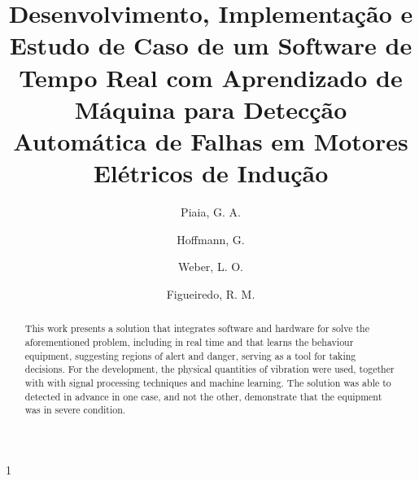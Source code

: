 \documentclass[a4paper]{ifacconf}
\def\portugues{1}
\def\portugues{0}
\begin{document}
	
	
\if\portugues1

% 
	
\begin{frontmatter}

\title{Desenvolvimento, Implementação e Estudo de Caso de um Software de Tempo Real com Aprendizado de Máquina
para Detecção Automática de Falhas em Motores Elétricos de Indução} 



\author[First]{Piaia, G. A.} 
\author[Second]{Hoffmann, G.} 
\author[Third]{Weber, L. O.}
\author[Fourth]{Figueiredo, R. M.}

\address[First]{Programa de Pós-Graduação em Engenharia Elétrica, Universidade do Vale do Rio Dos Sinos - 
UNISINOS, RS \& Floki Desenvolvimento de Sistemas Industriais, RS (e-mail: piaia@flokisys.com).}
\address[Second]{Floki Desenvolvimento de Sistemas Industriais, RS (e-mail: giu@flokisys.com).}
\address[Third]{Floki Desenvolvimento de Sistemas Industriais, RS (e-mail: weber@flokisys.com).}
\address[Fourth]{Programa de Pós-Graduação em Engenharia Elétrica, Universidade do Vale do Rio Dos Sinos - 
UNISINOS, RS (e-mail: marquesf@unisinos.br).}



\renewcommand{\abstractname}{{\bf Abstract:~}}
\begin{abstract}                %
                        This work presents a solution that integrates software and hardware for solve the aforementioned problem,
                        including in real time and that learns the behaviour equipment, suggesting regions of alert and
                        danger, serving as a tool for taking decisions. For the development, the physical quantities of
                        vibration were used, together with with signal processing techniques and machine learning. 
                        The solution was able to detected in advance in one case, and not the other, demonstrate that the equipment was in
                        severe condition.


\end{abstract}
\end{frontmatter}
\end{document}
